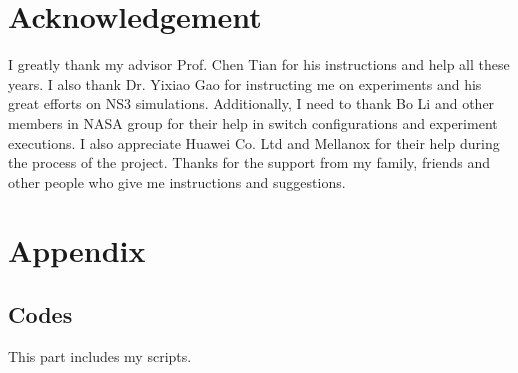 \documentclass[12pt,a4paper]{article}
\begin{document}
\section*{Acknowledgement}

I greatly thank my advisor Prof. Chen Tian for his instructions and help all these years.
I also thank Dr. Yixiao Gao for instructing me on experiments and his great efforts on NS3 simulations.
Additionally, I need to thank Bo Li and other members in NASA group for their help in switch configurations and experiment executions.
I also appreciate Huawei Co. Ltd and Mellanox for their help during the process of the project.
Thanks for the support from my family, friends and other people who give me instructions and suggestions.






\newpage
\section*{Appendix}

\subsection*{Codes}
This part includes my scripts.
\end{document}
